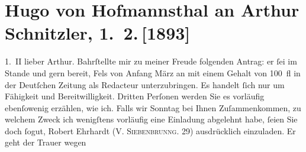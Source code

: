 

         
         \renewcommand{\erwaehntePersonen}{Personen: Hermann Bahr, Robert Ehrhart-Ehrhartstein, Friedrich Michael Fels, Hugo von Hofmannsthal}
         \renewcommand{\erwaehnteInstitutionen}{Institutionen: Deutsche Zeitung}
         \renewcommand{\erwaehnteOrte}{Orte: Siebenbrunnengasse, Wien}
         \renewcommand{\erwaehnteWerke}{Werke: Sterben. Novelle}
               \section[Hugo von Hofmannsthal an Arthur Schnitzler, 1. 2. {[}1893{]}]{ Hugo von Hofmannsthal an Arthur Schnitzler, 1. 2. {[}1893{]}}\nopagebreak{}\rehead{ }\begin{ledgroupsized}[t]{13cm}\normalsize\beginnumbering \toendnotes[C]{\smallbreak\pagebreak[2]} 
\pstart
           \raggedleft{}{\pb}1. II\pend
           \pstart{}lieber Arthur.\pend\pstart
           Bahrſtellte mir zu meiner Freude folgenden Antrag: er
               ſei im Stande und gern bereit, Fels von
                  Anfang März an mit einem Gehalt von 100 fl in der Deutſchen Zeitung als Redacteur unterzubringen. Es handelt ſich
               nur um Fähigkeit und Bereitwilligkeit. Dritten Perſonen werden Sie es vorläufig
               ebenſowenig erzählen, wie ich.\pend
           \pstart
           Falls wir Sonntag bei Ihnen Zuſammenkommen, zu welchem {\pb}Zweck ich wenigſtens vorläufig
               eine Einladung abgelehnt habe, ſeien Sie doch ſogut, Robert Ehrhardt (\textsc{V. Siebenbrunng. 29}) ausdrücklich einzuladen. Er geht der Trauer wegen

\end{ledgroupsized}
